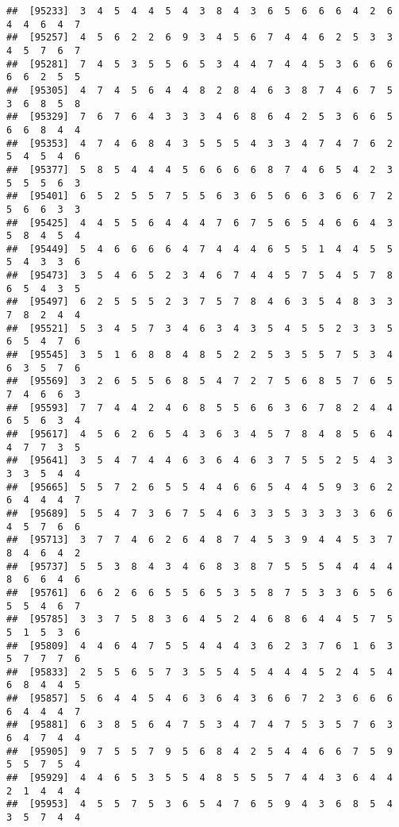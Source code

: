 \documentclass[
]{book}
\begin{document}
\begin{verbatim}
##  [95233]  3  4  5  4  4  5  4  3  8  4  3  6  5  6  6  6  4  2  6  4  4  6  4  7
##  [95257]  4  5  6  2  2  6  9  3  4  5  6  7  4  4  6  2  5  3  3  4  5  7  6  7
##  [95281]  7  4  5  3  5  5  6  5  3  4  4  7  4  4  5  3  6  6  6  6  6  2  5  5
##  [95305]  4  7  4  5  6  4  4  8  2  8  4  6  3  8  7  4  6  7  5  3  6  8  5  8
##  [95329]  7  6  7  6  4  3  3  3  4  6  8  6  4  2  5  3  6  6  5  6  6  8  4  4
##  [95353]  4  7  4  6  8  4  3  5  5  5  4  3  3  4  7  4  7  6  2  5  4  5  4  6
##  [95377]  5  8  5  4  4  4  5  6  6  6  6  8  7  4  6  5  4  2  3  5  5  5  6  3
##  [95401]  6  5  2  5  5  7  5  5  6  3  6  5  6  6  3  6  6  7  2  5  6  6  3  3
##  [95425]  4  4  5  5  6  4  4  4  7  6  7  5  6  5  4  6  6  4  3  5  8  4  5  4
##  [95449]  5  4  6  6  6  6  4  7  4  4  4  6  5  5  1  4  4  5  5  5  4  3  3  6
##  [95473]  3  5  4  6  5  2  3  4  6  7  4  4  5  7  5  4  5  7  8  6  5  4  3  5
##  [95497]  6  2  5  5  5  2  3  7  5  7  8  4  6  3  5  4  8  3  3  7  8  2  4  4
##  [95521]  5  3  4  5  7  3  4  6  3  4  3  5  4  5  5  2  3  3  5  6  5  4  7  6
##  [95545]  3  5  1  6  8  8  4  8  5  2  2  5  3  5  5  7  5  3  4  6  3  5  7  6
##  [95569]  3  2  6  5  5  6  8  5  4  7  2  7  5  6  8  5  7  6  5  7  4  6  6  3
##  [95593]  7  7  4  4  2  4  6  8  5  5  6  6  3  6  7  8  2  4  4  6  5  6  3  4
##  [95617]  4  5  6  2  6  5  4  3  6  3  4  5  7  8  4  8  5  6  4  4  7  7  3  5
##  [95641]  3  5  4  7  4  4  6  3  6  4  6  3  7  5  5  2  5  4  3  3  3  5  4  4
##  [95665]  5  5  7  2  6  5  5  4  4  6  6  5  4  4  5  9  3  6  2  6  4  4  4  7
##  [95689]  5  5  4  7  3  6  7  5  4  6  3  3  5  3  3  3  3  6  6  4  5  7  6  6
##  [95713]  3  7  7  4  6  2  6  4  8  7  4  5  3  9  4  4  5  3  7  8  4  6  4  2
##  [95737]  5  5  3  8  4  3  4  6  8  3  8  7  5  5  5  4  4  4  4  8  6  6  4  6
##  [95761]  6  6  2  6  6  5  5  6  5  3  5  8  7  5  3  3  6  5  6  5  5  4  6  7
##  [95785]  3  3  7  5  8  3  6  4  5  2  4  6  8  6  4  4  5  7  5  5  1  5  3  6
##  [95809]  4  4  6  4  7  5  5  4  4  4  3  6  2  3  7  6  1  6  3  5  7  7  7  6
##  [95833]  2  5  5  6  5  7  3  5  5  4  5  4  4  4  5  2  4  5  4  6  8  4  4  5
##  [95857]  5  6  4  4  5  4  6  3  6  4  3  6  6  7  2  3  6  6  6  6  4  4  4  7
##  [95881]  6  3  8  5  6  4  7  5  3  4  7  4  7  5  3  5  7  6  3  6  4  7  4  4
##  [95905]  9  7  5  5  7  9  5  6  8  4  2  5  4  4  6  6  7  5  9  5  5  7  5  4
##  [95929]  4  4  6  5  3  5  5  4  8  5  5  5  7  4  4  3  6  4  4  2  1  4  4  4
##  [95953]  4  5  5  7  5  3  6  5  4  7  6  5  9  4  3  6  8  5  4  3  5  7  4  4

\end{verbatim}
\end{document}
